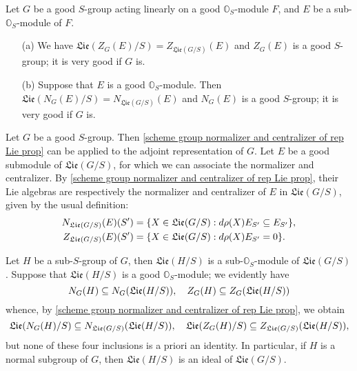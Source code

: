 \begin{theorem}\label{scheme group normalizer and centralizer of rep Lie prop}
Let $G$ be a good $S$-group acting linearly on a good $\mathbb{O}_S$-module $F$, and $E$ be a sub-$\mathbb{O}_S$-module of $F$.
\begin{enumerate}
    \item[(a)] We have $\mathfrak{Lie}(Z_G(E)/S)=Z_{\mathfrak{Lie}(G/S)}(E)$ and $Z_G(E)$ is a good $S$-group; it is very good if $G$ is.
    \item[(b)] Suppose that $E$ is a good $\mathbb{O}_S$-module. Then $\mathfrak{Lie}(N_G(E)/S)=N_{\mathfrak{Lie}(G/S)}(E)$ and $N_G(E)$ is a good $S$-group; it is very good if $G$ is.
\end{enumerate}
\end{theorem}

\begin{example}
Let $G$ be a good $S$-group. Then \cref{scheme group normalizer and centralizer of rep Lie prop} can be applied to the adjoint representation of $G$. Let $E$ be a good submodule of $\mathfrak{Lie}(G/S)$, for which we can associate the normalizer and centralizer. By \cref{scheme group normalizer and centralizer of rep Lie prop}, their Lie algebras are respectively the normalizer and centralizer of $E$ in $\mathfrak{Lie}(G/S)$, given by the usual definition:
\begin{align*}
N_{\mathfrak{Lie}(G/S)}(E)(S')&=\{X\in\mathfrak{Lie}(G/S):d\rho(X)E_{S'}\subseteq E_{S'}\},\\
Z_{\mathfrak{Lie}(G/S)}(E)(S')&=\{X\in\mathfrak{Lie}(G/S):d\rho(X)E_{S'}=0\}.
\end{align*}
\end{example}

\begin{example}
Let $H$ be a sub-$S$-group of $G$, then $\mathfrak{Lie}(H/S)$ is a sub-$\mathbb{O}_S$-module of $\mathfrak{Lie}(G/S)$. Suppose that $\mathfrak{Lie}(H/S)$ is a good $\mathbb{O}_S$-module; we evidently have
\[N_G(H)\subseteq N_G(\mathfrak{Lie}(H/S)),\quad Z_G(H)\subseteq Z_G(\mathfrak{Lie}(H/S))\]
whence, by \cref{scheme group normalizer and centralizer of rep Lie prop}, we obtain
\[\mathfrak{Lie}(N_G(H)/S)\subseteq N_{\mathfrak{Lie}(G/S)}(\mathfrak{Lie}(H/S)),\quad \mathfrak{Lie}(Z_G(H)/S)\subseteq Z_{\mathfrak{Lie}(G/S)}(\mathfrak{Lie}(H/S)),\]
but none of these four inclusions is a priori an identity. In particular, if $H$ is a normal subgroup of $G$, then $\mathfrak{Lie}(H/S)$ is an ideal of $\mathfrak{Lie}(G/S)$.
\end{example}

